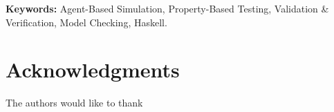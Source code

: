 \documentclass{scspaperproc}
\begin{document}
\textbf{Keywords:} Agent-Based Simulation, Property-Based Testing, Validation \& Verification, Model Checking, Haskell.

\maketitle

















\section*{Acknowledgments}
The authors would like to thank




\end{document}

